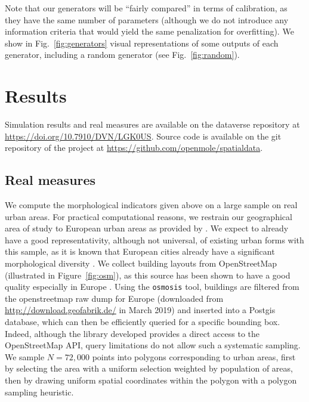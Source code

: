 \documentclass[letterpaper]{article}
\begin{document}
Note that our generators will be ``fairly compared'' in terms of calibration, as they have the same number of parameters (although we do not introduce any information criteria that would yield the same penalization for overfitting).
We show in Fig.~\ref{fig:generators} visual representations of some outputs of each generator, including a random generator (see Fig.~\ref{fig:random}).


\section{Results} \label{sec:results}

Simulation results and real measures are available on the dataverse repository at \url{https://doi.org/10.7910/DVN/LGK0US}. Source code is available on the git repository of the project at \url{https://github.com/openmole/spatialdata}.


\subsection{Real measures}

We compute the morphological indicators given above on a large sample on real urban areas. For practical computational reasons, we restrain our geographical area of study to European urban areas as provided by \cite{}. We expect to already have a good representativity, although not universal, of existing urban forms with this sample, as it is known that European cities already have a significant morphological diversity \citep{le2015forme}. We collect building layouts from OpenStreetMap (illustrated in Figure~\ref{fig:osm}), as this source has been shown to have a good quality especially in Europe \citep{mooney2010towards}. Using the \texttt{osmosis} tool, buildings are filtered from the openstreetmap raw dump for Europe (downloaded from \url{http://download.geofabrik.de/} in March 2019) and inserted into a Postgis database, which can then be efficiently queried for a specific bounding box. Indeed, although the library developed provides a direct access to the OpenStreetMap API, query limitations do not allow such a systematic sampling.
We sample $N=72,000$ points into polygons corresponding to urban areas, first by selecting the area with a uniform selection weighted by population of areas, then by drawing uniform spatial coordinates within the polygon with a polygon sampling heuristic. %
\end{document}
